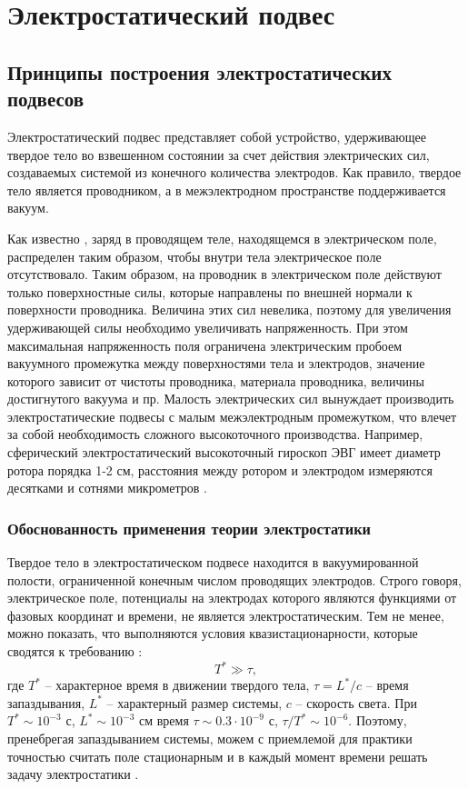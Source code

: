 \chapter{Электростатический подвес} \label{chapt1}


\section{Принципы построения электростатических подвесов} \label{sect1_1}

Электростатический подвес представляет собой устройство, удерживающее твердое тело во взвешенном состоянии за счет действия электрических сил, создаваемых системой из конечного количества электродов. Как правило, твердое тело является проводником, а в межэлектродном пространстве поддерживается вакуум.

Как известно \cite{Tamm}, заряд в проводящем теле, находящемся в электрическом поле, распределен таким образом, чтобы внутри тела электрическое поле отсутствовало. Таким образом, на проводник в электрическом поле действуют только поверхностные силы, которые направлены по внешней нормали к поверхности проводника. Величина этих сил невелика, поэтому для увеличения удерживающей силы необходимо увеличивать напряженность. При этом максимальная напряженность поля ограничена электрическим пробоем вакуумного промежутка между поверхностями тела и электродов, значение которого зависит от чистоты проводника, материала проводника, величины достигнутого вакуума и пр. Малость электрических сил вынуждает производить электростатические подвесы с малым межэлектродным промежутком, что влечет за собой необходимость сложного высокоточного производства. Например, сферический  электростатический высокоточный гироскоп ЭВГ имеет диаметр ротора порядка 1-2 см, расстояния между ротором и электродом измеряются десятками и сотнями микрометров \cite{Electropribor}.

\subsection{Обоснованность применения теории электростатики} \label{sect1_1_1}

Твердое тело в электростатическом подвесе находится в вакуумированной полости, ограниченной конечным числом проводящих электродов. Строго говоря, электрическое поле, потенциалы на электродах которого являются функциями от фазовых координат и времени, не является электростатическим. Тем не менее, можно показать, что выполняются условия квазистационарности, которые сводятся к требованию \cite{Tamm}:
\[
T^* \gg \tau,
\]
где $T^*$ – характерное время в движении твердого тела, $\tau = L^*/c$ – время запаздывания, $L^*$ – характерный размер системы, $c$ – скорость света. При $T^* \sim 10^{-3}$ с, $L^* \sim 10^{-3}$ см время $\tau \sim 0.3 \cdot 10^{-9}$ с, $\tau/T^* \sim 10^{-6}$.
Поэтому, пренебрегая запаздыванием системы, можем с приемлемой для практики точностью считать поле стационарным и в каждый момент времени решать задачу электростатики \cite{Martynenko}.


